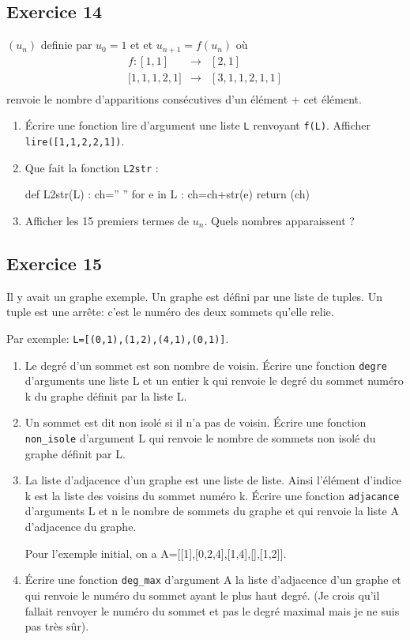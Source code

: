 \subsection*{Exercice 14}
$(u_n)$ definie par $u_0=1$ et et $u_{n+1}= f(u_n)$ où 
$$
\begin{array}{rcl}
f : [1,1] & \rightarrow  & [2,1] \\
\big[  1,1,1,2,1 \big]  & \rightarrow &  [3,1,1,2,1,1] \\
\end{array}
$$
renvoie le nombre d'apparitions consécutives d'un élément + cet élément.
\begin{enumerate}
\item Écrire une fonction lire d'argument une liste \texttt{L} renvoyant \texttt{f(L)}. Afficher \texttt{lire([1,1,2,2,1])}.
\item Que fait la fonction \texttt{L2str} :
\begin{python}
def  L2str(L) :
    ch='' ''
    for e in L :
        ch=ch+str(e)
    return (ch)
\end{python}
\item Afficher les 15 premiers termes de $u_n$. Quels nombres apparaissent ?
\end{enumerate}


\subsection*{Exercice 15}

Il y avait un graphe exemple. Un graphe est défini par une liste de tuples. Un tuple est une arrête: c'est le numéro des deux sommets qu'elle relie.

Par exemple: \texttt{L=[(0,1),(1,2),(4,1),(0,1)]}.

\begin{enumerate}
\item Le degré d'un sommet est son nombre de voisin. Écrire une fonction \texttt{degre} d'arguments une liste L et un entier k qui renvoie le degré du sommet numéro k du graphe définit par la liste L.
\item Un sommet est dit non isolé si il n'a pas de voisin. Écrire une fonction \texttt{non\_isole} d'argument L qui renvoie le nombre de sommets non isolé du graphe définit par L.
\item La liste d'adjacence d'un graphe est une liste de liste. Ainsi l'élément d'indice k est la liste des voisins du sommet numéro k.
Écrire une fonction \texttt{adjacance} d'arguments L et n le nombre de sommets du graphe et qui renvoie la liste A d'adjacence du graphe.

Pour l'exemple initial, on a A=[[1],[0,2,4],[1,4],[],[1,2]].

\item Écrire une fonction \texttt{deg\_max} d'argument A la liste d'adjacence d'un graphe et qui renvoie le numéro du sommet ayant le plus haut degré. (Je crois qu'il fallait renvoyer le numéro du sommet et pas le degré maximal mais je ne suis pas très sûr).
\end{enumerate}

